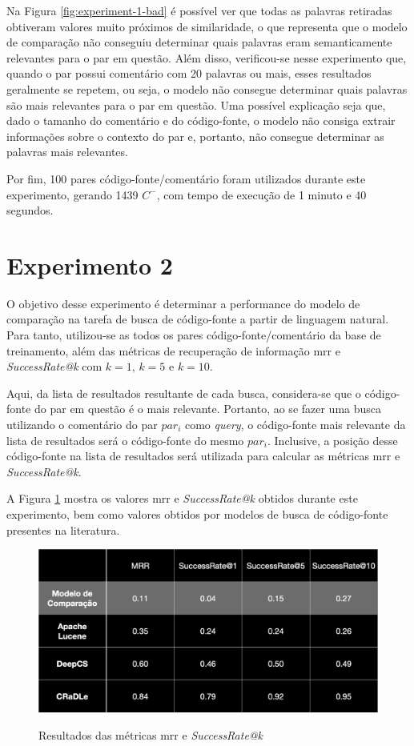 Na Figura \ref{fig:experiment-1-bad} é possível ver que todas as palavras retiradas obtiveram valores muito próximos de similaridade, o que representa que o modelo de comparação não conseguiu determinar quais palavras eram semanticamente relevantes para o par em questão. Além disso, verificou-se nesse experimento que, quando o par possui comentário com 20 palavras ou mais, esses resultados geralmente se repetem, ou seja, o modelo não consegue determinar quais palavras são mais relevantes para o par em questão. Uma possível explicação seja que, dado o tamanho do comentário e do código-fonte, o modelo não consiga extrair informações sobre o contexto do par e, portanto, não consegue determinar as palavras mais relevantes.

Por fim, 100 pares código-fonte/comentário foram utilizados durante este experimento, gerando 1439 $C^-$, com tempo de execução de 1 minuto e 40 segundos.

\section{Experimento 2} 
\label{sec:results:experiment-2}
O objetivo desse experimento é determinar a performance do modelo de comparação na tarefa de busca de código-fonte a partir de linguagem natural. Para tanto, utilizou-se as todos os pares código-fonte/comentário da base de treinamento, além das métricas de recuperação de informação \gls{mrr} e \textit{SuccessRate@k} com $k=1$, $k=5$ e $k=10$.

Aqui, da lista de resultados resultante de cada busca, considera-se que o código-fonte do par em questão é o mais relevante. Portanto, ao se fazer uma busca utilizando o comentário do par $par_i$ como \textit{query}, o código-fonte mais relevante da lista de resultados será o código-fonte do mesmo $par_i$. Inclusive, a posição desse código-fonte na lista de resultados será utilizada para calcular as métricas \gls{mrr} e \textit{SuccessRate@k}.

A Figura \ref{fig:results:experiment-2} mostra os valores \gls{mrr} e \textit{SuccessRate@k} obtidos durante este experimento, bem como valores obtidos por modelos de busca de código-fonte presentes na literatura.

\begin{figure}[H]
  \centering
      \caption{Resultados das métricas \gls{mrr} e \textit{SuccessRate@k}}
      \includegraphics[scale=0.3]{imagens/resultados/experiment-2/experiment-2-results.png}
      \label{fig:results:experiment-2}
\end{figure}

